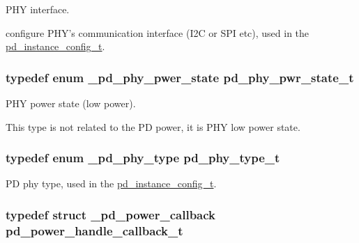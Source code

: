 P\-H\-Y interface. 

configure P\-H\-Y's communication interface (I2\-C or S\-P\-I etc), used in the \hyperlink{group__usb__pd__stack_gafa6034f9e204836697da1f2fc996cbad}{pd\-\_\-instance\-\_\-config\-\_\-t}. \hypertarget{group__usb__pd__stack_gaba31b8436256d541d1f6f9cd01c94fe5}{
\subsubsection[{pd\-\_\-phy\-\_\-pwr\-\_\-state\-\_\-t}]{\setlength{\rightskip}{0pt plus 5cm}typedef enum {\bf \-\_\-pd\-\_\-phy\-\_\-pwer\-\_\-state}  {\bf pd\-\_\-phy\-\_\-pwr\-\_\-state\-\_\-t}}}\label{group__usb__pd__stack_gaba31b8436256d541d1f6f9cd01c94fe5}


P\-H\-Y power state (low power). 

This type is not related to the P\-D power, it is P\-H\-Y low power state. \hypertarget{group__usb__pd__stack_gaafe9b09173bbffaa5075085b0dab18ec}{
\subsubsection[{pd\-\_\-phy\-\_\-type\-\_\-t}]{\setlength{\rightskip}{0pt plus 5cm}typedef enum {\bf \-\_\-pd\-\_\-phy\-\_\-type}  {\bf pd\-\_\-phy\-\_\-type\-\_\-t}}}\label{group__usb__pd__stack_gaafe9b09173bbffaa5075085b0dab18ec}


P\-D phy type, used in the \hyperlink{group__usb__pd__stack_gafa6034f9e204836697da1f2fc996cbad}{pd\-\_\-instance\-\_\-config\-\_\-t}. 

\hypertarget{group__usb__pd__stack_gaf1142461de7d7dcc6268c286ba956265}{
\subsubsection[{pd\-\_\-power\-\_\-handle\-\_\-callback\-\_\-t}]{\setlength{\rightskip}{0pt plus 5cm}typedef struct {\bf \-\_\-pd\-\_\-power\-\_\-callback}  {\bf pd\-\_\-power\-\_\-handle\-\_\-callback\-\_\-t}}}\label{group__usb__pd__stack_gaf1142461de7d7dcc6268c286ba956265}


